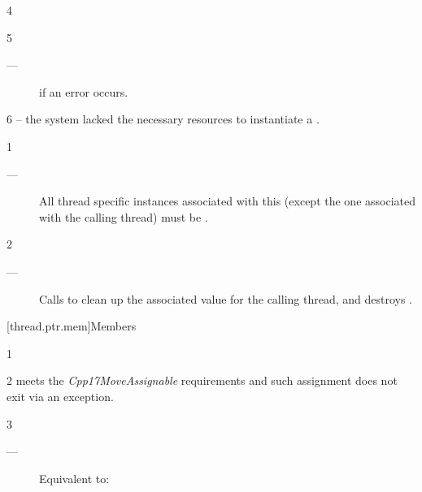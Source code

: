 \documentclass[fontsize=10pt,paper=A4,pagesize,DIV=15]{scrartcl}
\begin{document}
4 \postcond
{}

5 \except
\begin{description}
    \item[---]  if an error occurs.
\end{description}

6 \errors
{} -- the system lacked the necessary
resources to instantiate a \tptr.


1 \precond
\begin{description}
    \item[---] All thread specific instances associated with this \tptr
               (except the one associated with the calling thread) must be
               .
\end{description}

2 \effects
\begin{description}
    \item[---] Calls  to clean up the associated value for the
               calling thread, and destroys \this.
\end{description}


[thread.ptr.mem]{Members}


1 \constraints
{}

2 \precond
{} meets the \emph{Cpp17MoveAssignable} requirements and such
assignment does not exit via an exception.

3 \effects
\begin{description}
    \item[---] Equivalent to: 
\end{description}

\end{document}
